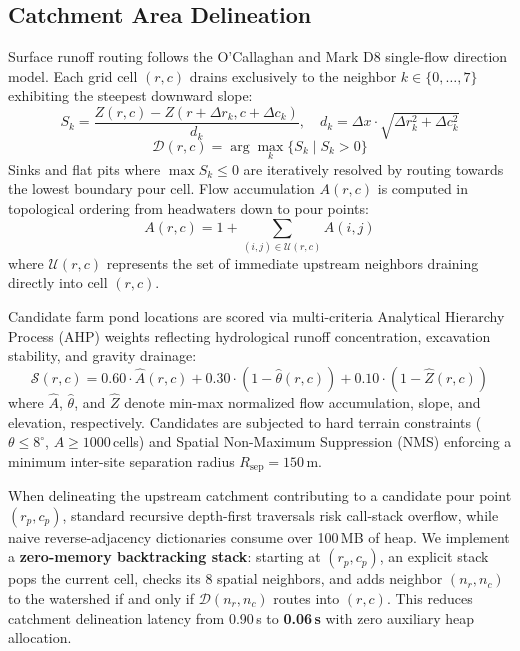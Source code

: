 \documentclass[manuscript,screen,review]{acmart}
\begin{document}
\subsection{Catchment Area Delineation}
Surface runoff routing follows the O'Callaghan and Mark D8 single-flow direction model. Each grid cell $(r, c)$ drains exclusively to the neighbor $k \in \{0, \dots, 7\}$ exhibiting the steepest downward slope:
\begin{equation}
    S_k = \frac{Z(r, c) - Z(r + \Delta r_k, c + \Delta c_k)}{d_k}, \quad d_k = \Delta x \cdot \sqrt{\Delta r_k^2 + \Delta c_k^2}
\end{equation}
\begin{equation}
    \mathcal{D}(r, c) = \arg\max_{k} \{S_k \mid S_k > 0\}
\end{equation}
Sinks and flat pits where $\max S_k \le 0$ are iteratively resolved by routing towards the lowest boundary pour cell. Flow accumulation $A(r, c)$ is computed in topological ordering from headwaters down to pour points:
\begin{equation}
    A(r, c) = 1 + \sum_{(i, j) \in \mathcal{U}(r, c)} A(i, j)
\end{equation}
where $\mathcal{U}(r, c)$ represents the set of immediate upstream neighbors draining directly into cell $(r, c)$.

Candidate farm pond locations are scored via multi-criteria Analytical Hierarchy Process (AHP) weights reflecting hydrological runoff concentration, excavation stability, and gravity drainage:
\begin{equation}
    \mathcal{S}(r, c) = 0.60 \cdot \hat{A}(r, c) + 0.30 \cdot (1 - \hat{\theta}(r, c)) + 0.10 \cdot (1 - \hat{Z}(r, c))
\end{equation}
where $\hat{A}$, $\hat{\theta}$, and $\hat{Z}$ denote min-max normalized flow accumulation, slope, and elevation, respectively. Candidates are subjected to hard terrain constraints ($\theta \le 8^\circ$, $A \ge 1000$\,cells) and Spatial Non-Maximum Suppression (NMS) enforcing a minimum inter-site separation radius $R_{\text{sep}} = 150$\,m.

When delineating the upstream catchment contributing to a candidate pour point $(r_p, c_p)$, standard recursive depth-first traversals risk call-stack overflow, while naive reverse-adjacency dictionaries consume over 100\,MB of heap. We implement a \textbf{zero-memory backtracking stack}: starting at $(r_p, c_p)$, an explicit stack pops the current cell, checks its 8 spatial neighbors, and adds neighbor $(n_r, n_c)$ to the watershed if and only if $\mathcal{D}(n_r, n_c)$ routes into $(r, c)$. This reduces catchment delineation latency from 0.90\,s to \textbf{0.06\,s} with zero auxiliary heap allocation.
\end{document}
